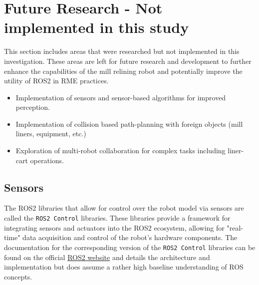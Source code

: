 \documentclass[10pt,a4paper,english]{article}
\begin{document}
\section{Future Research - Not implemented in this study}
This section includes areas that were researched but not implemented in this investigation. These areas are left for future research and development to further enhance the capabilities of the mill relining robot and potentially improve the utility of ROS2 in RME practices.

\begin{itemize}
    \item Implementation of sensors and sensor-based algorithms for improved perception.
    \item Implementation of collision based path-planning with foreign objects (mill liners, equipment, etc.)
    \item Exploration of multi-robot collaboration for complex tasks including liner-cart operations.
\end{itemize}

\subsection{Sensors}
The ROS2 libraries that allow for control over the robot model via sensors are called the \texttt{ROS2 Control} libraries. These libraries provide a framework for integrating sensors and actuators into the ROS2 ecosystem, allowing for "real-time" data acquisition and control of the robot's hardware components. The documentation for the corresponding version of the \texttt{ROS2 Control} libraries can be found on the official \href{https://control.ros.org/kilted/doc/getting_started/getting_started.html#}{ROS2 website} and details the architecture and implementation but does assume a rather high baseline understanding of ROS concepts.
\end{document}
